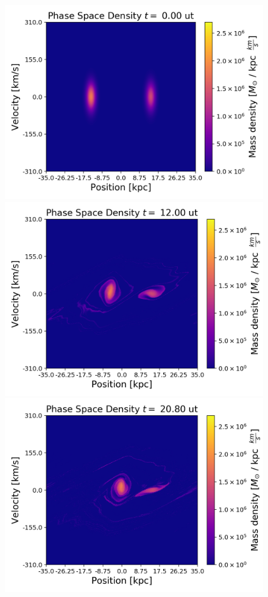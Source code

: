{\begin{figure}[h!]
    \centering
    \includegraphics[scale=0.45]{imag/cBulletPhase0.png}
    \includegraphics[scale=0.45]{imag/cBulletPhase30.png}
    \includegraphics[scale=0.45]{imag/cBulletPhase52.png}

\end{figure}}
